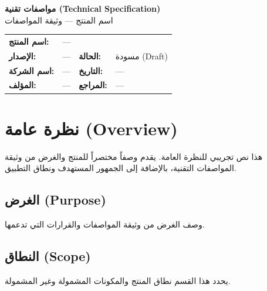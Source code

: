 \documentclass[11pt,a4paper]{article}
\begin{document}
\begin{center}
{\LARGE\bfseries مواصفات تقنية (Technical Specification)}\\[0.5em]
{\Large اسم المنتج --- وثيقة المواصفات}\\[1em]
\end{center}

\begin{table}[H]
\centering
\renewcommand{\arraystretch}{1.4}
\begin{tabularx}{\textwidth}{L{3.5cm} X L{3.5cm} L{3cm}}
\toprule
\textbf{اسم المنتج:} &  \\
\textbf{الإصدار:} & --- & \textbf{الحالة:} & مسودة (Draft) \\
\textbf{اسم الشركة:} & --- & \textbf{التاريخ:} & --- \\
\textbf{المؤلف:} & --- & \textbf{المراجع:} & --- \\
\bottomrule
\end{tabularx}
\end{table}

\vspace{0.5em}

\section{نظرة عامة (Overview)}
\label{sec:overview}

هذا نص تجريبي للنظرة العامة. يقدم وصفاً مختصراً للمنتج والغرض من وثيقة المواصفات
التقنية، بالإضافة إلى الجمهور المستهدف ونطاق التطبيق.

\subsection{الغرض (Purpose)}
وصف الغرض من وثيقة المواصفات والقرارات التي تدعمها.

\subsection{النطاق (Scope)}
يحدد هذا القسم نطاق المنتج والمكونات المشمولة وغير المشمولة.
\end{document}

